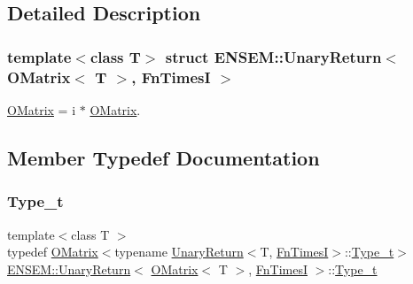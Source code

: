 \subsection{Detailed Description}
\subsubsection*{template$<$class T$>$\newline
struct E\+N\+S\+E\+M\+::\+Unary\+Return$<$ O\+Matrix$<$ T $>$, Fn\+Times\+I $>$}

\mbox{\hyperlink{classENSEM_1_1OMatrix}{O\+Matrix}} = i $\ast$ \mbox{\hyperlink{classENSEM_1_1OMatrix}{O\+Matrix}}. 

\subsection{Member Typedef Documentation}
\mbox{\label{structENSEM_1_1UnaryReturn_3_01OMatrix_3_01T_01_4_00_01FnTimesI_01_4_a823208991719b80307ceb78f0448f0de}} 
\subsubsection{\texorpdfstring{Type\_t}{Type\_t}\hspace{0.1cm}{\footnotesize\ttfamily [1/3]}}
{\footnotesize\ttfamily template$<$class T $>$ \\
typedef \mbox{\hyperlink{classENSEM_1_1OMatrix}{O\+Matrix}}$<$typename \mbox{\hyperlink{structENSEM_1_1UnaryReturn}{Unary\+Return}}$<$T, \mbox{\hyperlink{structENSEM_1_1FnTimesI}{Fn\+TimesI}}$>$\+::\mbox{\hyperlink{structENSEM_1_1UnaryReturn_3_01OMatrix_3_01T_01_4_00_01FnTimesI_01_4_a823208991719b80307ceb78f0448f0de}{Type\+\_\+t}}$>$ \mbox{\hyperlink{structENSEM_1_1UnaryReturn}{E\+N\+S\+E\+M\+::\+Unary\+Return}}$<$ \mbox{\hyperlink{classENSEM_1_1OMatrix}{O\+Matrix}}$<$ T $>$, \mbox{\hyperlink{structENSEM_1_1FnTimesI}{Fn\+TimesI}} $>$\+::\mbox{\hyperlink{structENSEM_1_1UnaryReturn_3_01OMatrix_3_01T_01_4_00_01FnTimesI_01_4_a823208991719b80307ceb78f0448f0de}{Type\+\_\+t}}}

\mbox{\label{structENSEM_1_1UnaryReturn_3_01OMatrix_3_01T_01_4_00_01FnTimesI_01_4_a823208991719b80307ceb78f0448f0de}} 

